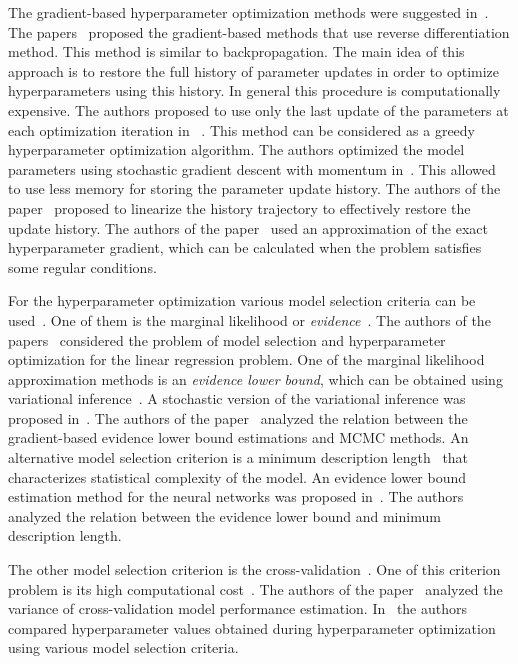 \documentclass[smallcondensed]{svjour3}
\begin{document}
The gradient-based hyperparameter optimization methods were suggested in~\cite{hyper,hyper2,hyper_mad,hyper_hoag,hyper_greed}. The papers~\cite{hyper_mad,hyper} proposed the gradient-based methods that use reverse differentiation method. This method is similar to backpropagation. The main idea of this approach is to restore the full history of parameter updates in order to optimize hyperparameters using this history. In general this procedure is computationally expensive. The authors proposed to use only the last update of the parameters at each optimization iteration in~\cite{hyper_greed} . This method can be considered as a greedy hyperparameter optimization algorithm. The authors optimized the model parameters using stochastic gradient descent with momentum in~\cite{hyper}. This allowed to use less memory for storing the parameter update history. The authors of the paper~\cite{hyper_mad} proposed to linearize the history trajectory to effectively restore the update history. The authors of the paper~\cite{hyper_hoag} used an approximation of the exact hyperparameter gradient, which can be calculated when the problem satisfies some regular conditions.

For the hyperparameter optimization various model selection criteria can be used~\cite{MacKay,Bishop}. One of them is the marginal likelihood or \textit{evidence}~\cite{MacKay,Bishop,tokmakova,strijov_dsc}. The authors  of the papers~\cite{tokmakova,strijov_dsc}  considered the problem of model selection and hyperparameter optimization for the linear regression problem. One of the marginal likelihood approximation methods is an \textit{evidence lower bound}, which can be obtained using variational inference~\cite{Bishop}. A stochastic version of the variational inference was proposed in~\cite{hoffman}. The authors of the paper~\cite{varmc} analyzed the relation between the gradient-based evidence lower bound estimations and MCMC methods. An alternative model selection criterion is a minimum description length~\cite{mdl} that characterizes statistical complexity of the model. An evidence lower bound estimation method for the neural networks was proposed in~\cite{nips}. The authors analyzed the relation between the evidence lower bound and minimum description length. 

The other model selection criterion is the cross-validation~\cite{cv_ms,tokmakova}. One of this criterion problem  is its high computational cost~\cite{expensive,expensive2}. The authors of the paper~\cite{bias2} analyzed the variance of cross-validation model performance estimation. In~\cite{tokmakova} the authors compared hyperparameter values obtained during hyperparameter optimization using various model selection criteria.
\end{document}
